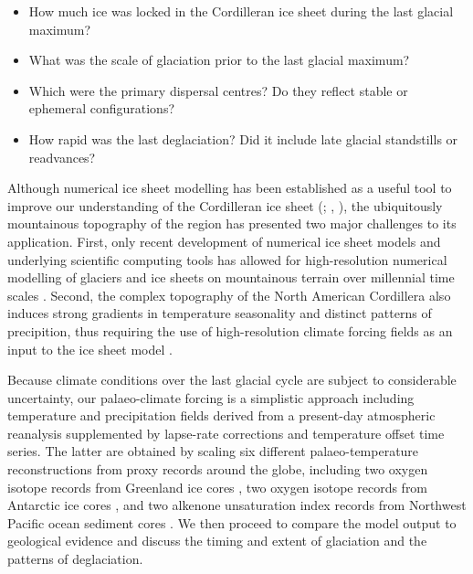 \documentclass[tc]{copernicus}
\begin{document}
\begin{itemize}
  \item How much ice was locked in the Cordilleran ice sheet during the
    last glacial maximum?
  \item What was the scale of glaciation prior to the last glacial maximum?
  \item Which were the primary dispersal centres? Do they reflect stable or
    ephemeral configurations?
  \item How rapid was the last deglaciation? Did it include late glacial
    standstills or readvances?
\end{itemize}

Although numerical ice sheet modelling has been established as a useful tool to
improve our understanding of the Cordilleran ice sheet
    (\citealp[p.~227]{Jackson.Clague.1991}; \citealp{Robert.1991},
     \citealp{Marshall.etal.2000}),
the ubiquitously mountainous
topography of the region has presented two major challenges to its application.
First, only recent development of numerical ice sheet models and underlying
scientific computing tools \citep{Bueler.Brown.2009, Balay.etal.2015} has
allowed for high-resolution numerical modelling of glaciers and ice sheets on
mountainous terrain
over millennial time scales \citep[e.g.,][]{Golledge.etal.2012}. Second, the
complex
topography of the North American Cordillera also induces strong gradients in
temperature
seasonality and distinct patterns of precipition, thus requiring the use of
high-resolution climate forcing fields as an input to the ice sheet model
\citep{Seguinot.etal.2014}.

Because climate conditions over the last glacial cycle are subject to
considerable uncertainty, our palaeo-climate forcing is a simplistic approach
including temperature and precipitation fields derived from a
present-day atmospheric reanalysis \citep{Mesinger.etal.2006,
Seguinot.etal.2014} supplemented by lapse-rate corrections
and temperature offset time series. The latter are obtained by scaling six
different palaeo-temperature reconstructions from proxy records around the
globe, including two oxygen isotope records from Greenland ice cores
\citep{Dansgaard.etal.1993, Andersen.etal.2004}, two oxygen isotope
records from Antarctic ice cores \citep{Petit.etal.1999,Jouzel.etal.2007},
and two alkenone unsaturation index records from Northwest Pacific ocean
sediment cores \citep{Herbert.etal.2001}. We then proceed to compare the model
output to geological evidence and discuss the timing and extent of glaciation
and the patterns of deglaciation.
\end{document}
